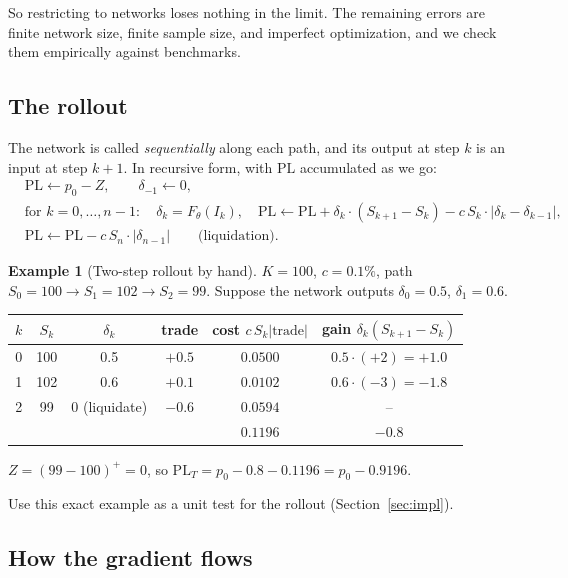 \documentclass[11pt]{article}
\theoremstyle{definition}
\newtheorem{example}[theorem]{Example}
\theoremstyle{remark}
\newcommand{\PL}{\mathrm{PL}}
\begin{document}
So restricting to networks loses nothing in the limit. The remaining errors are finite network size,
finite sample size, and imperfect optimization, and we check them empirically against benchmarks.

\subsection{The rollout}

The network is called \emph{sequentially} along each path, and its output at step $k$ is an input at
step $k+1$. In recursive form, with $\PL$ accumulated as we go:
\begin{align*}
&\PL\leftarrow p_0-Z,\qquad \delta_{-1}\leftarrow0,\\
&\text{for }k=0,\dots,n-1:\quad
\delta_k=F_\theta(I_k),\quad
\PL\leftarrow\PL+\delta_k\cdot(S_{k+1}-S_k)-c\,S_k\cdot|\delta_k-\delta_{k-1}|,\\
&\PL\leftarrow\PL-c\,S_n\cdot|\delta_{n-1}|\qquad\text{(liquidation).}
\end{align*}

\begin{example}[Two-step rollout by hand]
$K=100$, $c=0.1\%$, path $S_0=100\to S_1=102\to S_2=99$. Suppose the network outputs $\delta_0=0.5$, $\delta_1=0.6$.

\begin{center}
\renewcommand{\arraystretch}{1.3}
\begin{tabular}{@{}cccccc@{}}
\toprule
$k$ & $S_k$ & $\delta_k$ & trade & cost $c\,S_k|\text{trade}|$ & gain $\delta_k(S_{k+1}-S_k)$\\
\midrule
0 & 100 & 0.5 & $+0.5$ & $0.0500$ & $0.5\cdot(+2)=+1.0$\\
1 & 102 & 0.6 & $+0.1$ & $0.0102$ & $0.6\cdot(-3)=-1.8$\\
2 & 99 & $0$ (liquidate) & $-0.6$ & $0.0594$ & --\\
\midrule
 & & & & $0.1196$ & $-0.8$\\
\bottomrule
\end{tabular}
\end{center}
$Z=(99-100)^+=0$, so $\PL_T=p_0-0.8-0.1196=p_0-0.9196$.

Use this exact example as a unit test for the rollout (Section~\ref{sec:impl}).
\end{example}

\subsection{How the gradient flows}
\end{document}
